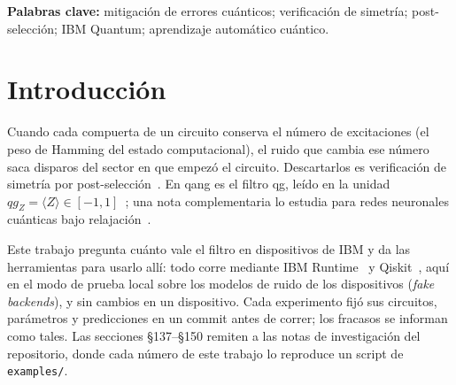 \documentclass[11pt]{article}
\newcommand{\qZ}{qg_Z}
\begin{document}
\begin{abstract}
mitad el mejor error y corre a circuitos más profundos el número óptimo de pasos de Trotter (16 de 21
dispositivos), y en una caminata cuántica convierte una dispersión cruda indistinguible de una caminata
clásica (exponente 0{,}87) en una dispersión balística (1{,}84). Con dos o tres excitaciones que interactúan (cadena XXZ) la ganancia
baja de 5{,}6 a 2{,}6 veces: los sectores más grandes dejan pasar más ruido. Al estimar la fidelidad de dos estados, el filtro reduce
3{,}8--11{,}2 veces el error de un test de inversión que conserva el peso, pero el del swap test solo
1{,}4--1{,}8 veces, porque la respuesta del swap test está en un qubit auxiliar fuera de la simetría. Los errores ZZ coherentes,
que conservan el peso, igual se filtran en parte (32--60\% del error agregado por interferencia ZZ
permanente), porque actúan en parte dentro de las descomposiciones nativas de las compuertas. Se encontraron dos errores de interoperabilidad, uno en
qiskit-machine-learning y otro en la biblioteca. Todos los resultados son sobre modelos de ruido de
dispositivos; no se informa ninguna corrida en hardware.
\end{abstract}

\noindent\textbf{Palabras clave:} mitigación de errores cuánticos; verificación de simetría;
post-selección; IBM Quantum; aprendizaje automático cuántico.

\section{Introducción}

Cuando cada compuerta de un circuito conserva el número de excitaciones (el peso de Hamming del estado
computacional), el ruido que cambia ese número saca disparos del sector en que empezó el circuito.
Descartarlos es verificación de simetría por post-selección~\cite{bonetmonroig2018,mcardle2019}. En qang es
el filtro qg, leído en la unidad $\qZ=\langle Z\rangle\in[-1,1]$~\cite{monteverde2026qang}; una nota
complementaria lo estudia para redes neuronales cuánticas bajo relajación~\cite{monteverde2026qml}.

Este trabajo pregunta cuánto vale el filtro en dispositivos de IBM y da las herramientas para usarlo allí:
todo corre mediante IBM Runtime~\cite{qiskitibmruntime} y Qiskit~\cite{javadiabhari2024qiskit}, aquí en el
modo de prueba local sobre los modelos de ruido de los dispositivos (\emph{fake backends}), y sin cambios en
un dispositivo. Cada experimento fijó sus circuitos, parámetros y predicciones en un commit antes de
correr; los fracasos se informan como tales. Las secciones §137--§150 remiten a las notas de investigación
del repositorio, donde cada número de este trabajo lo reproduce un script de \texttt{examples/}.
\end{document}
